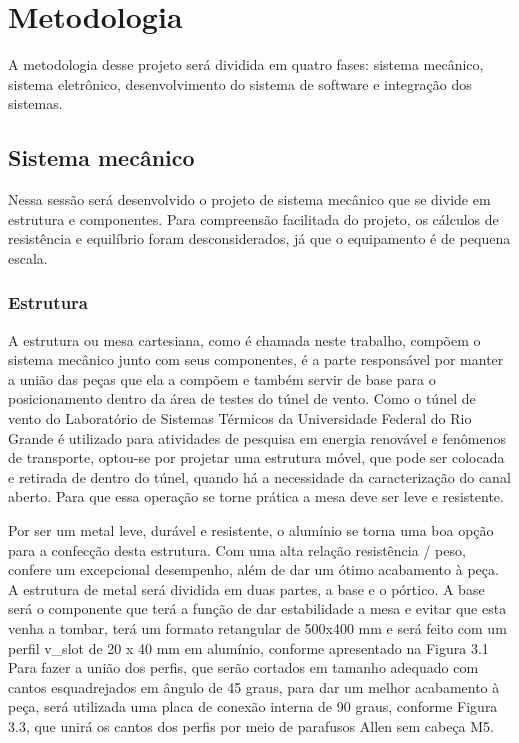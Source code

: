 \chapter{Metodologia}
\label{chap:metodologia}

A metodologia desse projeto será dividida em quatro fases: sistema mecânico, sistema eletrônico, 
desenvolvimento do sistema de software e integração dos sistemas.

\section{Sistema mecânico}

Nessa sessão será desenvolvido o projeto de sistema mecânico que se divide em estrutura e componentes. 
Para compreensão facilitada do projeto, os cálculos de resistência e equilíbrio foram desconsiderados, 
já que o equipamento é de pequena escala.

\subsection{Estrutura}

A estrutura ou mesa cartesiana, como é chamada neste trabalho, compõem o sistema mecânico junto com seus 
componentes, é a parte responsável por manter a união das peças que ela a compõem e também servir de base 
para o posicionamento dentro da área de testes do túnel de vento. Como o túnel de vento do Laboratório de 
Sistemas Térmicos da Universidade Federal do Rio Grande é utilizado para atividades de pesquisa em energia 
renovável e fenômenos de transporte, optou-se por projetar uma estrutura móvel, que pode ser colocada e 
retirada de dentro do túnel, quando há a necessidade da caracterização do canal aberto. Para que essa 
operação se torne prática a mesa deve ser leve e resistente.

Por ser um metal leve, durável e resistente, o alumínio se torna uma boa opção para a confecção desta 
estrutura. Com uma alta relação resistência / peso, confere um excepcional desempenho, além de dar um ótimo 
acabamento à peça. A estrutura de metal será dividida em duas partes, a base e o pórtico. A base será 
o componente que terá a função de dar estabilidade a mesa e evitar que esta venha  a tombar, terá um 
formato retangular de 500x400 mm e será feito com um perfil v\_slot de 20 x 40 mm em alumínio, conforme 
apresentado na Figura 3.1 Para fazer a união dos perfis, que serão cortados em tamanho adequado com cantos 
esquadrejados em ângulo de 45 graus, para dar um melhor acabamento à peça, será utilizada uma placa de 
conexão interna de 90 graus, conforme Figura 3.3, que unirá os cantos dos perfis por meio de parafusos 
Allen sem cabeça M5.

